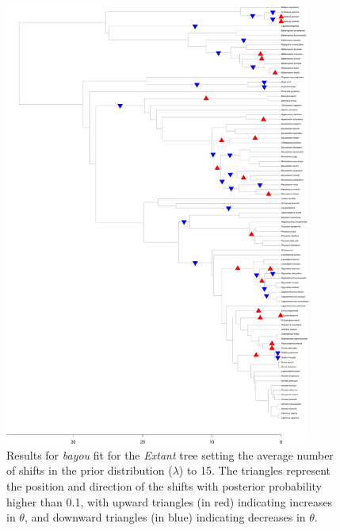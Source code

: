 \begin{figure}[H]
\includegraphics[width=0.9\textwidth]{img/plots-extant-k15-1.pdf}
\caption{Results for \textit{bayou} fit for the \textit{Extant} tree setting the average number of shifts in the prior distribution ($\lambda$) to 15. The triangles represent the position and direction of the shifts with posterior probability higher than 0.1, with upward triangles (in red) indicating increases in $\theta$, and downward triangles (in blue) indicating decreases in $\theta$.}
\label{fig:extant-k15}
\end{figure}

\newpage


